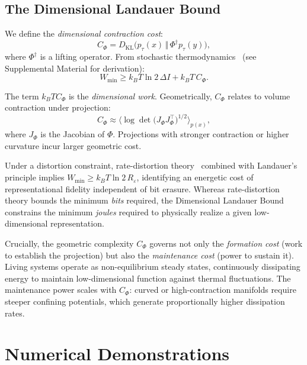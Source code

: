 \documentclass[aps,prx,twocolumn,superscriptaddress,floatfix]{revtex4-2}
\begin{document}
\subsection{The Dimensional Landauer Bound}

We define the \emph{dimensional contraction cost}:
\begin{equation}
C_\Phi = D_{\mathrm{KL}}\big(p_\tau(x)\,\Vert\,\Phi^\dagger p_\tau(y)\big),
\end{equation}
where $\Phi^\dagger$ is a lifting operator. From stochastic thermodynamics~\cite{seifert2012,chen2021} (see Supplemental Material for derivation):
\begin{equation}
\boxed{W_{\min} \ge k_B T \ln 2\, \Delta I + k_B T\, C_\Phi.}
\label{eq:main}
\end{equation}

The term $k_B T C_\Phi$ is the \emph{dimensional work}. Geometrically, $C_\Phi$ relates to volume contraction under projection:
\begin{equation}
C_\Phi \approx \Big\langle \log \det\big(J_\Phi J_\Phi^\top\big)^{1/2} \Big\rangle_{p(x)},
\end{equation}
where $J_\Phi$ is the Jacobian of $\Phi$. Projections with stronger contraction or higher curvature incur larger geometric cost.

Under a distortion constraint, rate-distortion theory~\cite{cover2006} combined with Landauer's principle implies $W_{\min} \ge k_B T \ln 2\, R_\varepsilon$, identifying an energetic cost of representational fidelity independent of bit erasure. Whereas rate-distortion theory bounds the minimum \emph{bits} required, the Dimensional Landauer Bound constrains the minimum \emph{joules} required to physically realize a given low-dimensional representation.

Crucially, the geometric complexity $C_\Phi$ governs not only the \emph{formation cost} (work to establish the projection) but also the \emph{maintenance cost} (power to sustain it). Living systems operate as non-equilibrium steady states, continuously dissipating energy to maintain low-dimensional function against thermal fluctuations. The maintenance power scales with $C_\Phi$: curved or high-contraction manifolds require steeper confining potentials, which generate proportionally higher dissipation rates.

\section{Numerical Demonstrations}
\end{document}
